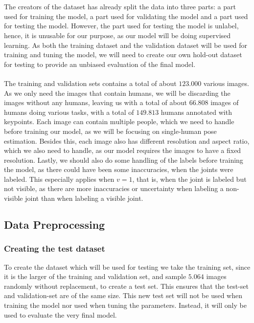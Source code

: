 \documentclass[./main.tex]{subfiles}
\begin{document}
\\
\\
The creators of the dataset has already split the data into three parts: a part used for training the model, a part used for validating the model and a part used for testing the model. However, the part used for testing the model is unlabel, hence, it is unusable for our purpose, as our model will be doing supervised learning. As both the training dataset and the validation dataset will be used for training and tuning the model, we will need to create our own hold-out dataset for testing to provide an unbiased evaluation of the final model. 
\\
\\
The training and validation sets contains a total of about $123.000$ various images. As we only need the images that contain humans, we will be discarding the images without any humans, leaving us with a total of about $66.808$ images of humans doing various tasks, with a total of $149.813$ humans annotated with keypoints. Each image can contain multiple people, which we need to handle before training our model, as we will be focusing on single-human pose estimation. Besides this, each image also has different resolution and aspect ratio, which we also need to handle, as our model requires the images to have a fixed resolution. Lastly, we should also do some handling of the labels before training the model, as there could have been some inaccuracies, when the joints were labeled. This especially applies when $v = 1$, that is, when the joint is labeled but not visible, as there are more inaccuracies or uncertainty when labeling a non-visible joint than when labeling a visible joint.

\subsection{Data Preprocessing}\label{subsec:data_preprocessing}
\subsubsection{Creating the test dataset}
To create the dataset which will be used for testing we take the training set, since it is the larger of the training and validation set, and sample $5.064$ images randomly without replacement, to create a test set. This ensures that the test-set and validation-set are of the same size. This new test set will not be used when training the model nor used when tuning the parameters. Instead, it will only be used to evaluate the very final model. 
\end{document}
